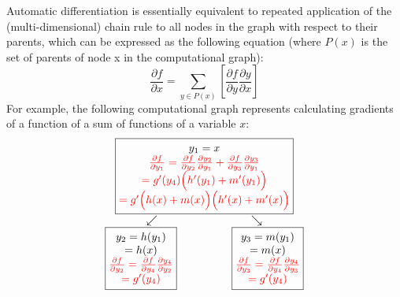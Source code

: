 Automatic differentiation is essentially equivalent to repeated application of the (multi-dimensional) chain rule to all nodes in the graph with respect to their parents, which can be expressed as the following equation (where $P(x)$ is the set of parents of node x in the computational graph):
\begin{equation}
    \frac{\partial f}{\partial x} = \sum_{y\in P(x)}{\left[ \frac{\partial f}{\partial y}\frac{\partial y}{\partial x}\right]}
\end{equation}
For example, the following computational graph represents calculating gradients of a function of a sum of functions of a variable $x$:
\begin{equation*}
    \begin{matrix}
        \boxed{\begin{matrix}
            y_1=x \\
            \color{red}{\frac{\partial f}{\partial y_1} = \frac{\partial f}{\partial y_2}\frac{\partial y_2}{\partial y_1} + \frac{\partial f}{\partial y_3}\frac{\partial y_3}{\partial y_1}} \\
            \color{red}{= g'(y_4)\Bigl(h'(y_1) + m'(y_1)\Bigr)} \\
            \color{red}{= g'\Bigl(h(x) + m(x)\Bigr)\Bigl(h'(x) + m'(x)\Bigr)}
        \end{matrix}} \\
        \begin{matrix}
            \swarrow & \searrow \\
            \boxed{\begin{matrix}
                y_2=h(y_1) \\
                =h(x) \\
                \color{red}{\frac{\partial f}{\partial y_2} = \frac{\partial f}{\partial y_4}\frac{\partial y_4}{\partial y_2}} \\
                \color{red}{= g'(y_4)}
            \end{matrix}} \qquad & \qquad
            \boxed{\begin{matrix}
                y_3=m(y_1) \\
                =m(x) \\
                \color{red}{\frac{\partial f}{\partial y_3} = \frac{\partial f}{\partial y_4}\frac{\partial y_4}{\partial y_3}} \\
                \color{red}{= g'(y_4)}
            \end{matrix}} \\

\end{matrix}
\end{matrix}
\end{equation*}
